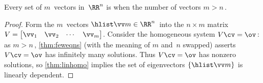 \begin{theorem} \label{thm:mgtnli} 
Every  set of \(m\)~vectors in~\(\RR^n\) is  when the number of vectors \(m>n\)\,.
\end{theorem}
\begin{proof} 
Form the \(m\)~vectors \(\hlist\vv m\in\RR^n\)\ into the \(n\times m\) matrix \(V=\begin{bmatrix} \vv_1&\vv_2&\cdots&\vv_m \end{bmatrix}\).
Consider the homogeneous system \(V\cv=\ov\)\,: 
as \(m>n\)\,, \cref{thm:feweqns} (with the meaning of \(m\) and~\(n\) swapped) asserts \(V\cv=\ov\) has infinitely many solutions.
Thus \(V\cv=\ov\) has nonzero solutions, so \cref{thm:linhomo} implies the set of eigenvectors \(\{\hlist\vv m\}\) is linearly dependent.
\end{proof}



